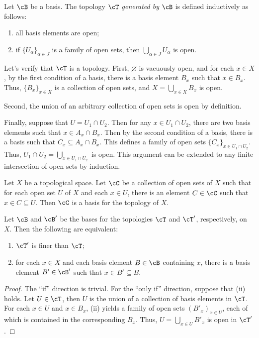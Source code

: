 \documentclass{amsart}
\begin{document}
\begin{defn}
  Let $\cB$ be a basis.
  The topology $\cT$ \emph{generated by} $\cB$ is defined inductively as follows:
  \begin{enumerate}
  \item all basis elements are open;
  \item if $\{U_{\alpha}\}_{\alpha \in J}$ is a family of open sets, then $\bigcup_{\alpha \in J}U_{\alpha}$ is open.
  \end{enumerate}
\end{defn}

Let's verify that $\cT$ is a topology.
First, $\varnothing$ is vacuously open, and for each $x \in X$, by the first condition of a basis, there is a basis element $B_{x}$ such that $x \in B_{x}$.
Thus, $\{B_{x}\}_{x \in X}$ is a collection of open sets, and $X = \bigcup_{x \in X}B_{x}$ is open.

Second, the union of an arbitrary collection of open sets is open by definition.

Finally, suppose that $U = U_{1} \cap U_{2}$.
Then for any $x \in U_{1} \cap U_{2}$, there are two basis elements such that $x \in A_{x} \cap B_{x}$.
Then by the second condition of a basis, there is a basis such that $C_{x} \subseteq A_{x} \cap B_{x}$.
This defines a family of open sets $\{C_{x}\}_{x \in U_{1} \cap U_{2}}$.
Thus, $U_{1} \cap U_{2} = \bigcup_{x \in U_{1} \cap U_{2}}$ is open.
This argument can be extended to any finite intersection of open sets by induction.

\begin{lem}
  Let $X$ be a topological space.
  Let $\cC$ be a collection of open sets of $X$ such that for each open set $U$ of $X$ and each $x \in U$, there is an element $C \in \cC$ such that $x \in C \subseteq U$.
  Then $\cC$ is a basis for the topology of $X$.
\end{lem}

\begin{lem}
  Let $\cB$ and $\cB'$ be the bases for the topologies $\cT$ and $\cT'$, respectively, on $X$.
  Then the following are equivalent:
  \begin{enumerate}
  \item $\cT'$ is finer than $\cT$;
  \item for each $x \in X$ and each basis element $B \in \cB$ containing $x$, there is a basis element $B' \in \cB'$ such that $x \in B' \subseteq B$.
  \end{enumerate}
\end{lem}
\begin{proof}
  The ``if'' direction is trivial.
  For the ``only if'' direction, suppose that (ii) holds.
  Let $U \in \cT$, then $U$ is the union of a collection of basis elements in $\cT$.
  For each $x \in U$ and $x \in B_{x}$, (ii) yields a family of open sets $(B'_{x})_{x \in U}$, each of which is contained in the corresponding $B_{x}$.
  Thus, $U = \bigcup_{x \in U}B'_{x}$ is open in $\cT'$.
\end{proof}
\end{document}
